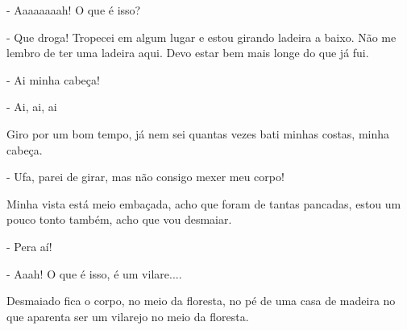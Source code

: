 - Aaaaaaaah! O que é isso?

- Que droga! Tropecei em algum lugar e estou girando ladeira a baixo. Não me lembro de ter uma ladeira aqui. Devo estar bem mais longe do que já fui.

- Ai minha cabeça!

- Ai, ai, ai

Giro por um bom tempo, já nem sei quantas vezes bati minhas costas, minha cabeça.

- Ufa, parei de girar, mas não consigo mexer meu corpo!

Minha vista está meio embaçada, acho que foram de tantas pancadas, estou um pouco tonto também, acho que vou desmaiar. 

- Pera aí!

- Aaah! O que é isso, é um vilare....

Desmaiado fica o corpo, no meio da floresta, no pé de uma casa de madeira no que aparenta ser um vilarejo no meio da floresta.


